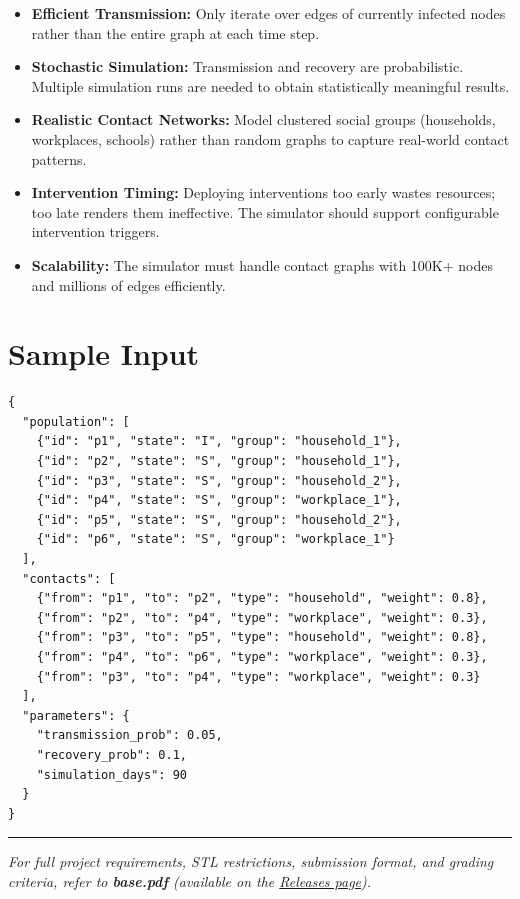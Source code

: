 \begin{itemize}
  \item \textbf{Efficient Transmission:} Only iterate over edges of currently infected nodes rather than the entire graph at each time step.
  \item \textbf{Stochastic Simulation:} Transmission and recovery are probabilistic. Multiple simulation runs are needed to obtain statistically meaningful results.
  \item \textbf{Realistic Contact Networks:} Model clustered social groups (households, workplaces, schools) rather than random graphs to capture real-world contact patterns.
  \item \textbf{Intervention Timing:} Deploying interventions too early wastes resources; too late renders them ineffective. The simulator should support configurable intervention triggers.
  \item \textbf{Scalability:} The simulator must handle contact graphs with 100K+ nodes and millions of edges efficiently.
\end{itemize}

\section{Sample Input}

\begin{lstlisting}[style=json]
{
  "population": [
    {"id": "p1", "state": "I", "group": "household_1"},
    {"id": "p2", "state": "S", "group": "household_1"},
    {"id": "p3", "state": "S", "group": "household_2"},
    {"id": "p4", "state": "S", "group": "workplace_1"},
    {"id": "p5", "state": "S", "group": "household_2"},
    {"id": "p6", "state": "S", "group": "workplace_1"}
  ],
  "contacts": [
    {"from": "p1", "to": "p2", "type": "household", "weight": 0.8},
    {"from": "p2", "to": "p4", "type": "workplace", "weight": 0.3},
    {"from": "p3", "to": "p5", "type": "household", "weight": 0.8},
    {"from": "p4", "to": "p6", "type": "workplace", "weight": 0.3},
    {"from": "p3", "to": "p4", "type": "workplace", "weight": 0.3}
  ],
  "parameters": {
    "transmission_prob": 0.05,
    "recovery_prob": 0.1,
    "simulation_days": 90
  }
}
\end{lstlisting}

\vfill
\noindent\rule{\textwidth}{0.4pt}
{\small\textit{For full project requirements, STL restrictions, submission format, and grading criteria, refer to \textbf{base.pdf} (available on the \href{https://github.com/BestSithInEU/cse211-term-projects/releases}{Releases page}).}}
